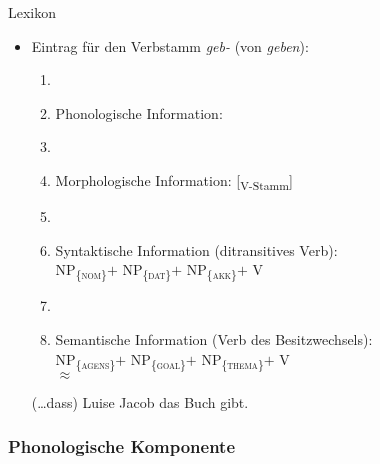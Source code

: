 \begin{frame}{Lexikon}
			
\begin{itemize}
	\item Eintrag für den Verbstamm \emph{geb-} (von \emph{geben}): 

	\begin{enumerate}
		\item[]
		\item Phonologische Information: 
		\item[]
		\item Morphologische Information: [\textsubscript{V-Stamm}] 
		\item[]
		\item Syntaktische Information (ditransitives Verb):\\
			NP\textsubscript{\{\textsc{nom}\}}$+$
			NP\textsubscript{\{\textsc{dat}\}}$+$
			NP\textsubscript{\{\textsc{akk}\}}$+$
			V
					
		\item[]
		\item Semantische Information (Verb des Besitzwechsels):\\
			NP\textsubscript{\{\textsc{agens}\}}$+$
			NP\textsubscript{\{\textsc{goal}\}}$+$
			NP\textsubscript{\{\textsc{thema}\}}$+$
			V \\
			$\approx$
	\end{enumerate}		  


\ea (\dots dass) Luise Jacob das Buch gibt.
\z 
\end{itemize}

\end{frame}


\subsubsection{Phonologische Komponente}


